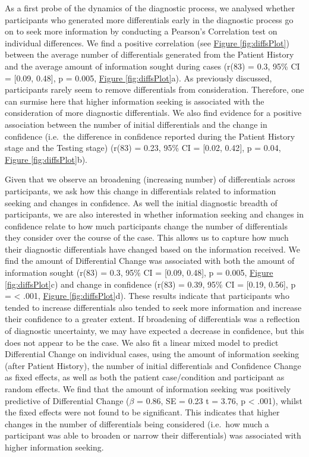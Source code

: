 \documentclass[a4paper, nobind]{templates/ociamthesis}
\begin{document}
As a first probe of the dynamics of the diagnostic process, we analysed whether participants who generated more differentials early in the diagnostic process go on to seek more information by conducting a Pearson's Correlation test on individual differences. We find a positive correlation (see \hyperref[fig:diffsPlot]{Figure \ref{fig:diffsPlot}}) between the average number of differentials generated from the Patient History and the average amount of information sought during cases (r(83) = 0.3, 95\% CI = {[}0.09, 0.48{]}, p = 0.005, \hyperref[fig:diffsPlot]{Figure \ref{fig:diffsPlot}}a). As previously discussed, participants rarely seem to remove differentials from consideration. Therefore, one can surmise here that higher information seeking is associated with the consideration of more diagnostic differentials. We also find evidence for a positive association between the number of initial differentials and the change in confidence (i.e.~the difference in confidence reported during the Patient History stage and the Testing stage) (r(83) = 0.23, 95\% CI = {[}0.02, 0.42{]}, p = 0.04, \hyperref[fig:diffsPlot]{Figure \ref{fig:diffsPlot}}b).

\hfill\break
Given that we observe an broadening (increasing number) of differentials across participants, we ask how this change in differentials related to information seeking and changes in confidence. As well the initial diagnostic breadth of participants, we are also interested in whether information seeking and changes in confidence relate to how much participants change the number of differentials they consider over the course of the case. This allows us to capture how much their diagnostic differentials have changed based on the information received. We find the amount of Differential Change was associated with both the amount of information sought (r(83) = 0.3, 95\% CI = {[}0.09, 0.48{]}, p = 0.005, \hyperref[fig:diffsPlot]{Figure \ref{fig:diffsPlot}}c) and change in confidence (r(83) = 0.39, 95\% CI = {[}0.19, 0.56{]}, p = \textless{} .001, \hyperref[fig:diffsPlot]{Figure \ref{fig:diffsPlot}}d). These results indicate that participants who tended to increase differentials also tended to seek more information and increase their confidence to a greater extent. If broadening of differentials was a reflection of diagnostic uncertainty, we may have expected a decrease in confidence, but this does not appear to be the case. We also fit a linear mixed model to predict Differential Change on individual cases, using the amount of information seeking (after Patient History), the number of initial differentials and Confidence Change as fixed effects, as well as both the patient case/condition and participant as random effects. We find that the amount of information seeking was positively predictive of Differential Change (\(\beta\) = 0.86, SE = 0.23 t = 3.76, p \textless{} .001), whilst the fixed effects were not found to be significant. This indicates that higher changes in the number of differentials being considered (i.e.~how much a participant was able to broaden or narrow their differentials) was associated with higher information seeking.
\end{document}
